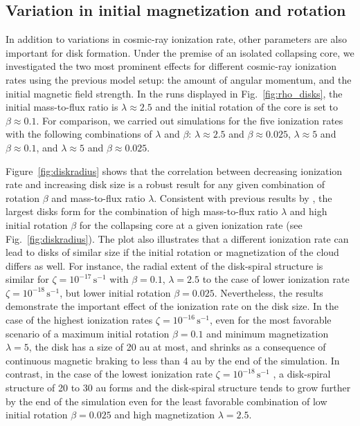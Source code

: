 \documentclass{aa}
\newcommand{\unit}[1]{\ensuremath{\, \mathrm{#1}}}
\newcommand{\Fig}[1]{Fig.~\ref{fig:#1}}    %
\newcommand{\Figure}[1]{Figure~\ref{fig:#1}}    %
\begin{document}
\subsection{Variation in initial magnetization and rotation}
In addition to variations in cosmic-ray ionization rate, other parameters are also important for disk formation.
Under the premise of an isolated collapsing core, we investigated the two most prominent effects  for different cosmic-ray ionization rates using the previous
model setup: the amount of angular momentum, and the initial magnetic field strength. 
In the runs displayed in \Fig{rho_disks}, the initial mass-to-flux ratio is $\lambda \approx 2.5$ and the initial rotation of the core is set to $\beta \approx 0.1$. 
For comparison, we carried out simulations for the five ionization rates with the following combinations of $\lambda$ and $\beta$: $\lambda \approx 2.5$ and $\beta \approx 0.025$, $\lambda \approx 5$ and $\beta \approx 0.1$, and $\lambda \approx 5$ and $\beta \approx 0.025$.  


\Figure{diskradius} shows that the correlation between decreasing ionization rate and increasing disk size is a robust result for any given combination of rotation $\beta$ and mass-to-flux ratio $\lambda$.
Consistent with previous results by \citet{Zhao2016}, the largest disks form for the combination of high mass-to-flux ratio $\lambda$ and high initial rotation $\beta$ for the collapsing core at a given ionization rate (see \Fig{diskradius}). 
The plot also illustrates that a different ionization rate can lead to disks of similar size if the initial rotation or magnetization of the cloud differs as well. 
For instance, the radial extent of the disk-spiral structure is similar for $\zeta=10^{-17}\unit{s}^{-1}$ with $\beta=0.1$, $\lambda=2.5$ to the case of lower ionization rate $\zeta=10^{-18}\unit{s}^{-1}$, but lower initial rotation $\beta=0.025$.
Nevertheless, the results demonstrate the important effect of the ionization rate on the disk size. 
In the case of the highest ionization rates $\zeta=10^{-16}\unit{s}^{-1}$, even for the most favorable scenario of a maximum initial rotation $\beta=0.1$ and minimum magnetization $\lambda=5$, the disk has a size of 20 au at most, and shrinks as a consequence of continuous magnetic braking to less than 4 au by the end of the simulation.  
In contrast, in the case of the lowest ionization rate $\zeta=10^{-18} \unit{s}^{-1}$ , a disk-spiral structure of 20 to 30
au forms and the disk-spiral structure tends to grow further by the end of
the simulation even for the least favorable combination of low initial rotation $\beta=0.025$ and high magnetization $\lambda=2.5$.  
\end{document}
